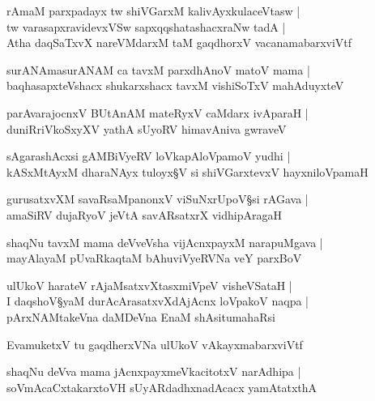 \begin{shloka}
rAmaM parxpadayx tw shiVGarxM kalivAyxkulaceVtasw |\\
tw varasapxravidevxVSw sapxqqshatashacxraNw tadA |\\
Atha daqSaTxvX nareVMdarxM taM gaqdhorxV vacanamabarxviVtf
\end{shloka}

\begin{shloka}
surANAmasurANAM ca tavxM parxdhAnoV matoV mama |\\
baqhasapxteVshacx shukarxshacx tavxM vishiSoTxV mahAduyxteV 
\end{shloka}

\begin{shloka}
parAvarajocnxV BUtAnAM mateRyxV caMdarx ivAparaH |\\
duniRriVkoSxyXV yathA sUyoRV himavAniva gwraveV 
\end{shloka}

\begin{shloka}
sAgarashAcxsi gAMBiVyeRV loVkapAloVpamoV yudhi |\\
kASxMtAyxM dharaNAyx tuloyx\S V si shiVGarxtevxV hayxniloVpamaH 
\end{shloka}

\begin{shloka}
gurusatxvXM savaRsaMpanonxV viSuNxrUpoV\S si rAGava |\\
amaSiRV dujaRyoV jeVtA savARsatxrX vidhipAragaH 
\end{shloka}

\begin{shloka}
shaqNu tavxM mama deVveVsha vijAcnxpayxM narapuMgava |\\
mayAlayaM pUvaRkaqtaM bAhuviVyeRVNa veY parxBoV
\end{shloka}

\begin{shloka}
ulUkoV harateV rAjaMsatxvXtasxmiVpeV visheVSataH |\\
I daqshoV\S yaM durAcArasatxvXdAjAcnx loVpakoV naqpa |\\
pArxNAMtakeVna daMDeVna EnaM shAsitumahaRsi
\end{shloka}

\begin{shloka}
EvamuketxV tu gaqdherxVNa ulUkoV vAkayxmabarxviVtf
\end{shloka}

\begin{shloka}
shaqNu deVva mama jAcnxpayxmeVkacitotxV narAdhipa |\\
soVmAcaCxtakarxtoVH sUyARdadhxnadAcacx yamAtatxthA 
\end{shloka}

